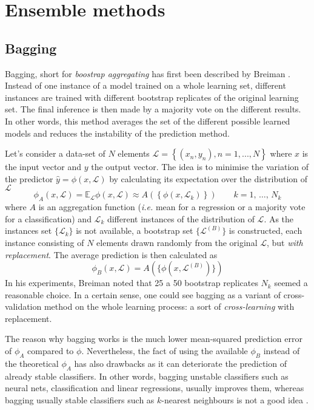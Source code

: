 \section{Ensemble methods}
\subsection{Bagging}
Bagging, short for \emph{boostrap aggregating} has first been described by Breiman \cite{Breiman1996BaggingPredictors}. Instead of one instance of a model trained on a whole learning set, different instances are trained with different bootstrap replicates of the original learning set. The final inference is then made by a majority vote on the different results. In other words, this method averages the set of the different possible learned models and reduces the instability of the prediction method. 

Let's consider a data-set of $N$ elements $\mathcal{L}=\left\{ \left( x_n,y_n\right),n=1,...,N\right\}$ where $x$ is the input vector and $y$ the output vector. The idea is to minimise the variation of the predictor $\hat{y}=\phi\left(x,\mathcal{L}\right)$ by calculating its expectation over the distribution of $\mathcal{L}$
\begin{equation}
    \phi_A\left(x,\mathcal{L}\right) = \mathbb{E}_\mathcal{L} \phi\left(x,\mathcal{L}\right) \approx A \left( \left\{ \phi\left(x,\mathcal{L}_k\right) \right\} \right) \qquad k=1,\, \ldots,\, N_k
\end{equation}
where $A$ is an aggregation function (\emph{i.e.} mean for a regression or a majority vote for a classification) and $\mathcal{L}_k$ different instances of the distribution of $\mathcal{L}$. As the instances set $\{ \mathcal{L}_k \}$ is not available, a bootstrap set $\{\mathcal{L}^{(B)}\}$ is constructed, each instance consisting of $N$ elements drawn randomly from the original $\mathcal{L}$, but \emph{with replacement}. The average prediction is then calculated as
\begin{equation}
    \phi_B\left(x,\mathcal{L}\right) = A(\{ \phi(x,\mathcal{L}^{(B)}) \})
\end{equation}
In his experiments, Breiman noted that 25 a 50 bootstrap replicates $N_k$ seemed a reasonable choice. In a certain sense, one could see bagging as a variant of cross-validation method on the whole learning process: a sort of \emph{cross-learning} with replacement.

The reason why bagging works is the much lower mean-squared prediction error of $\phi_A$ compared to $\phi$. Nevertheless, the fact of using the available $\phi_B$ instead of the theoretical $\phi_A$ has also drawbacks as it can deteriorate the prediction of already stable classifiers. In other words, bagging unstable classifiers such as neural nets, classification and linear regressions, usually improves them, whereas bagging usually stable classifiers such as $k$-nearest neighbours is not a good idea \cite{Breiman1996HeuristicsSelection}.

